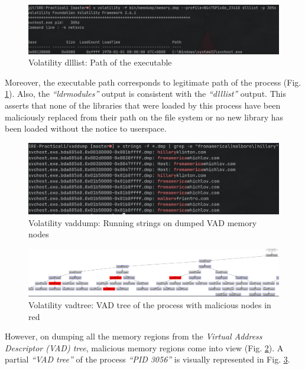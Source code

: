 \documentclass[10pt,a4paper]{article}
\begin{document}
					\begin{figure}[!htbp]%
						\centering
						\includegraphics[width=\columnwidth]{pics/svchostPath.png}
						\caption{Volatility dlllist: Path of the executable}
						\label{svchostPath}
					\end{figure}
					Moreover, the executable path corresponds to legitimate path of the process (Fig. \ref{svchostPath}). Also, the \textit{``ldrmodules''} output is consistent with the \textit{``dlllist''} output. This asserts that none of the libraries that were loaded by this process have been maliciously replaced from their path on the file system or no new library has been loaded without the notice to userspace. 

					\begin{figure}[!htbp]%
						\centering
						\includegraphics[width=\columnwidth]{pics/stringsdump.png}
						\caption{Volatility vaddump: Running strings on dumped VAD memory nodes}
						\label{vaddump}
					\end{figure}
					\begin{figure}[!htbp]%
						\centering
						\includegraphics[width=\columnwidth]{pics/vadtree.png}
						\caption{Volatility vadtree: VAD tree of the process with malicious nodes in red}
						\label{vadtree}
					\end{figure}
					However, on dumping all the memory regions from the \textit{Virtual Address Descriptor (VAD) tree}, malicious memory regions come into view (Fig. \ref{vaddump}).
					A partial \textit{``VAD tree''} of the process \textit{``PID 3056''} is visually represented in Fig. \ref{vadtree}.
\end{document}
